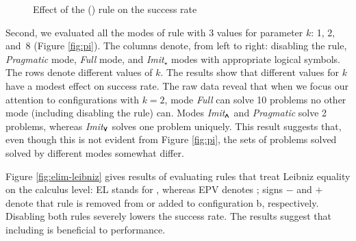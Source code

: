 
\begin{figure}[t]
  \begin{center}
    \def\arraystretch{1.1}%
    \caption{Effect of the () rule on the success rate }
    \label{fig:cases}
  \end{center}
\end{figure}

Second, we evaluated all the modes of  rule with 3 values for
parameter $k$: 1, 2, and~8 (Figure \ref{fig:pi}). The columns denote, from left to
right: disabling the  rule, \emph{Pragmatic} mode, \emph{Full} mode,
and \emph{Imit}$_\star$ modes with appropriate logical symbols. The rows denote
different values of $k$. The results show that different values for $k$ have a
modest effect on success rate. The raw data reveal that when we focus our
attention to configurations with $k=2$, mode \emph{Full} can solve 10 problems
no other mode (including disabling the  rule) can. Modes
\emph{Imit}$_{\pmb{\land}}$ and \emph{Pragmatic} solve 2  problems, whereas
\emph{Imit}$_{\pmb{\lor}}$ solves one problem uniquely. This result suggests that, even
though this is not evident from Figure \ref{fig:pi}, the sets of problems solved 
solved by different modes somewhat differ.

Figure \ref{fig:elim-leibniz} gives results of evaluating rules that treat
Leibniz equality on the calculus level: EL stands for ,
whereas EPV denotes ; signs $-$ and $+$ denote that rule is
removed from or added to configuration b, respectively. Disabling both rules
severely lowers the success rate. The results suggest that including
 is beneficial to performance.

